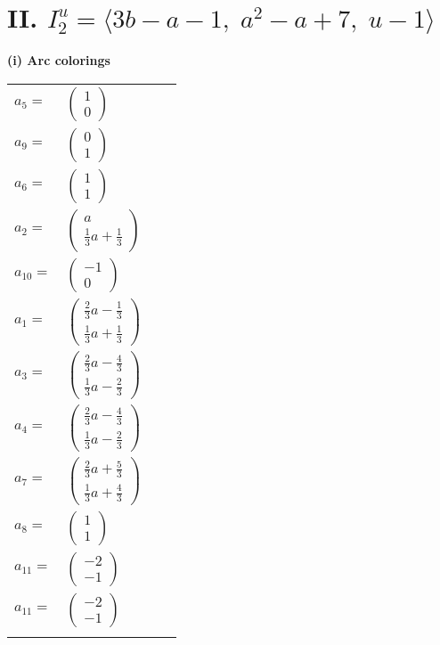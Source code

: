 \documentclass[1p]{elsarticle_modified}
\theoremstyle{definition}
\begin{document}
\centering \section*{II. $I^u_{2}= \langle 3 b- a-1,\;a^2- a+7,\;u-1 \rangle$}
\flushleft \textbf{(i) Arc colorings}\\
\begin{tabular}{m{7pt} m{180pt} m{7pt} m{180pt} }
\flushright $a_{5}=$&$\begin{pmatrix}1\\0\end{pmatrix}$ \\
\flushright $a_{9}=$&$\begin{pmatrix}0\\1\end{pmatrix}$ \\
\flushright $a_{6}=$&$\begin{pmatrix}1\\1\end{pmatrix}$ \\
\flushright $a_{2}=$&$\begin{pmatrix}a\\\frac{1}{3} a+\frac{1}{3}\end{pmatrix}$ \\
\flushright $a_{10}=$&$\begin{pmatrix}-1\\0\end{pmatrix}$ \\
\flushright $a_{1}=$&$\begin{pmatrix}\frac{2}{3} a-\frac{1}{3}\\\frac{1}{3} a+\frac{1}{3}\end{pmatrix}$ \\
\flushright $a_{3}=$&$\begin{pmatrix}\frac{2}{3} a-\frac{4}{3}\\\frac{1}{3} a-\frac{2}{3}\end{pmatrix}$ \\
\flushright $a_{4}=$&$\begin{pmatrix}\frac{2}{3} a-\frac{4}{3}\\\frac{1}{3} a-\frac{2}{3}\end{pmatrix}$ \\
\flushright $a_{7}=$&$\begin{pmatrix}\frac{2}{3} a+\frac{5}{3}\\\frac{1}{3} a+\frac{4}{3}\end{pmatrix}$ \\
\flushright $a_{8}=$&$\begin{pmatrix}1\\1\end{pmatrix}$ \\
\flushright $a_{11}=$&$\begin{pmatrix}-2\\-1\end{pmatrix}$\\ \flushright $a_{11}=$&$\begin{pmatrix}-2\\-1\end{pmatrix}$\\&\end{tabular}
\end{document}
